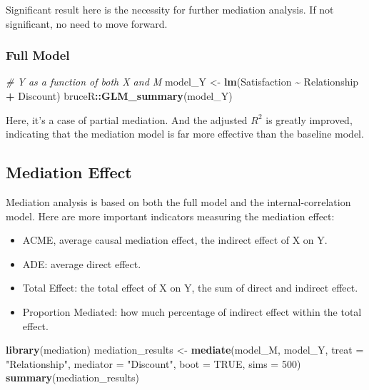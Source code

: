 \documentclass[
]{ctexart}
\newenvironment{Shaded}{\begin{snugshade}}{\end{snugshade}}
\newcommand{\AttributeTok}[1]{\textcolor[rgb]{0.13,0.29,0.53}{#1}}
\newcommand{\CommentTok}[1]{\textcolor[rgb]{0.56,0.35,0.01}{\textit{#1}}}
\newcommand{\ConstantTok}[1]{\textcolor[rgb]{0.56,0.35,0.01}{#1}}
\newcommand{\DecValTok}[1]{\textcolor[rgb]{0.00,0.00,0.81}{#1}}
\newcommand{\FunctionTok}[1]{\textcolor[rgb]{0.13,0.29,0.53}{\textbf{#1}}}
\newcommand{\NormalTok}[1]{#1}
\newcommand{\OtherTok}[1]{\textcolor[rgb]{0.56,0.35,0.01}{#1}}
\newcommand{\SpecialCharTok}[1]{\textcolor[rgb]{0.81,0.36,0.00}{\textbf{#1}}}
\newcommand{\StringTok}[1]{\textcolor[rgb]{0.31,0.60,0.02}{#1}}
\providecommand{\tightlist}{%
  \setlength{\itemsep}{0pt}\setlength{\parskip}{0pt}}
\begin{document}
Significant result here is the necessity for further mediation analysis.
If not significant, no need to move forward.

\hypertarget{full-model}{%
\subsubsection{Full Model}\label{full-model}}

\begin{Shaded}
\begin{Highlighting}[]
\CommentTok{\# Y as a function of both X and M}
\NormalTok{model\_Y }\OtherTok{\textless{}{-}} \FunctionTok{lm}\NormalTok{(Satisfaction }\SpecialCharTok{\textasciitilde{}}\NormalTok{ Relationship }\SpecialCharTok{+}\NormalTok{ Discount)}
\NormalTok{bruceR}\SpecialCharTok{::}\FunctionTok{GLM\_summary}\NormalTok{(model\_Y)}
\end{Highlighting}
\end{Shaded}

Here, it's a case of partial mediation. And the adjusted \(R^2\) is
greatly improved, indicating that the mediation model is far more
effective than the baseline model.

\hypertarget{mediation-effect}{%
\subsection{Mediation Effect}\label{mediation-effect}}

Mediation analysis is based on both the full model and the
internal-correlation model. Here are more important indicators measuring
the mediation effect:

\begin{itemize}
\tightlist
\item
  ACME, average causal mediation effect, the indirect effect of X on Y.
\item
  ADE: average direct effect.
\item
  Total Effect: the total effect of X on Y, the sum of direct and
  indirect effect.
\item
  Proportion Mediated: how much percentage of indirect effect within the
  total effect.
\end{itemize}

\begin{Shaded}
\begin{Highlighting}[]
\FunctionTok{library}\NormalTok{(mediation)}
\NormalTok{mediation\_results }\OtherTok{\textless{}{-}} \FunctionTok{mediate}\NormalTok{(model\_M, model\_Y, }\AttributeTok{treat =} \StringTok{"Relationship"}\NormalTok{, }\AttributeTok{mediator =} \StringTok{"Discount"}\NormalTok{,}
    \AttributeTok{boot =} \ConstantTok{TRUE}\NormalTok{, }\AttributeTok{sims =} \DecValTok{500}\NormalTok{)}
\FunctionTok{summary}\NormalTok{(mediation\_results)}
\end{Highlighting}
\end{Shaded}
\end{document}

